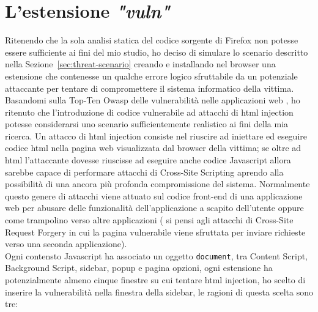 \documentclass{sapthesis}
\newcommand{\code}[1]{\texttt{#1}}
\newcommand{\Sezione}[1]{Sezione~\ref{#1}}
\newcommand{\vuln}{\textit{"vuln"}}
\newcommand{\JS}{Javascript }
\begin{document}
    \section{L'estensione \vuln}
    \label{sec:estensione-vuln}
        Ritenendo che la sola analisi statica del codice sorgente di Firefox non potesse essere
        sufficiente ai fini del mio studio, ho deciso di simulare lo scenario descritto nella
        \Sezione{sec:threat-scenario} creando e installando nel browser una estensione che contenesse
        un qualche errore logico sfruttabile da un potenziale attaccante per tentare di compromettere
        il sistema informatico della vittima.
        Basandomi sulla Top-Ten Owasp delle vulnerabilità nelle applicazioni web \cite{owasp-top-ten}, ho ritenuto
        che l'introduzione di codice vulnerabile ad attacchi di html injection potesse considerarsi uno scenario
        sufficientemente realistico ai fini della mia ricerca.
        Un attacco di html injection consiste nel riuscire ad iniettare ed eseguire codice html nella pagina web
        visualizzata dal browser della vittima; se oltre ad html l'attaccante dovesse riuscisse ad eseguire anche 
        codice \JS allora sarebbe capace di performare attacchi di Cross-Site Scripting aprendo alla possibilità
        di una ancora più profonda compromissione del sistema. Normalmente questo genere di attacchi viene
        attuato sul codice front-end di una applicazione web per abusare delle funzionalità dell'applicazione
        a scapito dell'utente oppure come trampolino verso altre applicazioni ( si pensi agli
        attacchi di Cross-Site Request Forgery in cui la pagina vulnerabile viene sfruttata per
        inviare richieste verso una seconda applicazione).\\
        Ogni contensto \JS ha associato un oggetto \code{document}, tra Content Script, Background Script, sidebar,
        popup e pagina opzioni, ogni estensione ha potenzialmente almeno cinque finestre su cui tentare
        html injection, ho scelto di inserire la vulnerabilità nella finestra della sidebar, le ragioni di
        questa scelta sono tre:
\end{document}
